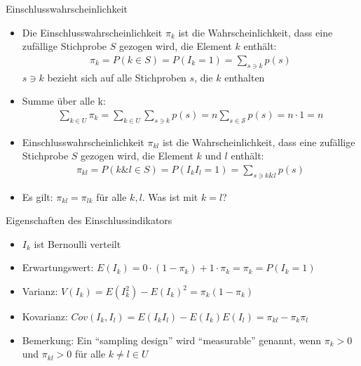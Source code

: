 \documentclass[9pt]{beamer}
\begin{document}
\begin{frame}{Einschlusswahrscheinlichkeit}
\begin{itemize}
	\item Die Einschlusswahrscheinlichkeit $\pi_k$ ist die Wahrscheinlichkeit, dass eine zufällige Stichprobe $S$ gezogen wird, die Element $k$ enthält:
	\begin{align*}
	\pi_k = P(k\in S)= P(I_k = 1) = \sum_{s\ni k}p(s)
	\end{align*}
	$s\ni k$ bezieht sich auf alle Stichproben $s$, die $k$ enthalten
	\item Summe über alle k:
	\begin{align*}
	\sum_{k \in U}\pi_k = \sum_{k \in U}\sum_{s\ni k} p(s) = n \sum_{s\in \mathcal{S}}p(s) = n\cdot 1 = n
	\end{align*}
	\item Einschlusswahrscheinlichkeit $\pi_{kl}$ ist die Wahrscheinlichkeit, dass eine zufällige Stichprobe $S$ gezogen wird, die Element $k$ und $l$ enthält:
	\begin{align*}
	\pi_{kl} = P(k\&l \in S)= P(I_k I_l= 1) = \sum_{s\ni k\&l}p(s)
	\end{align*}
	\item Es gilt: $\pi_{kl}=\pi_{lk}$ für alle $k,l$. Was ist mit $k=l$?
\end{itemize}
\end{frame}

\begin{frame}{Eigenschaften des Einschlussindikators}
\begin{itemize}
	\item $I_k$ ist Bernoulli verteilt
	\item Erwartungswert: $E(I_k)=0\cdot(1-\pi_k)+1\cdot\pi_k = \pi_k = P(I_k=1)$
	\item Varianz: $V(I_k) = E(I_k^2)-E(I_k)^2=\pi_k(1-\pi_k)$
	\item Kovarianz: $Cov(I_k,I_l) = E(I_k I_l) - E(I_k)E(I_l)=\pi_{kl}-\pi_k \pi_l$
	\item Bemerkung: Ein \enquote{sampling design} wird \enquote{measurable} genannt, wenn $\pi_k >0$ und $\pi_{kl}>0$ für alle $k\neq l \in U$
\end{itemize}
\end{frame}
\end{document}
